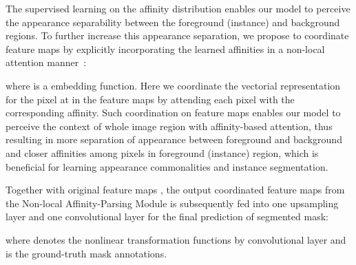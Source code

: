 \documentclass[runningheads]{llncs}
\begin{document}
The supervised learning on the affinity distribution enables our model to perceive the appearance separability between the foreground (instance) and background regions. To further increase this appearance separation, we propose to coordinate feature maps by explicitly incorporating the learned affinities in a non-local attention manner~\cite{wang2018non,pmlr-v97-zhang19f}:
\begin{small}

\end{small}

\vspace{-1mm}\noindent
where  is a embedding function. Here we coordinate the vectorial representation for the pixel at  in the feature maps by attending each pixel with the corresponding  affinity. Such coordination on feature maps enables our model to perceive the context of whole image region with affinity-based attention, thus resulting in more separation of appearance between foreground and background and closer affinities among pixels in foreground (instance) region, which is beneficial for learning appearance commonalities and instance segmentation. 

Together with original feature maps , the output coordinated feature maps  from the Non-local Affinity-Parsing Module is subsequently fed into one upsampling layer and one  convolutional layer for the final prediction of segmented mask:
\begin{small}

\end{small}

\vspace{-2mm}\noindent
where  denotes the nonlinear transformation functions by  convolutional layer and  is the ground-truth mask annotations.

\vspace{-0.1in}
\end{document}
